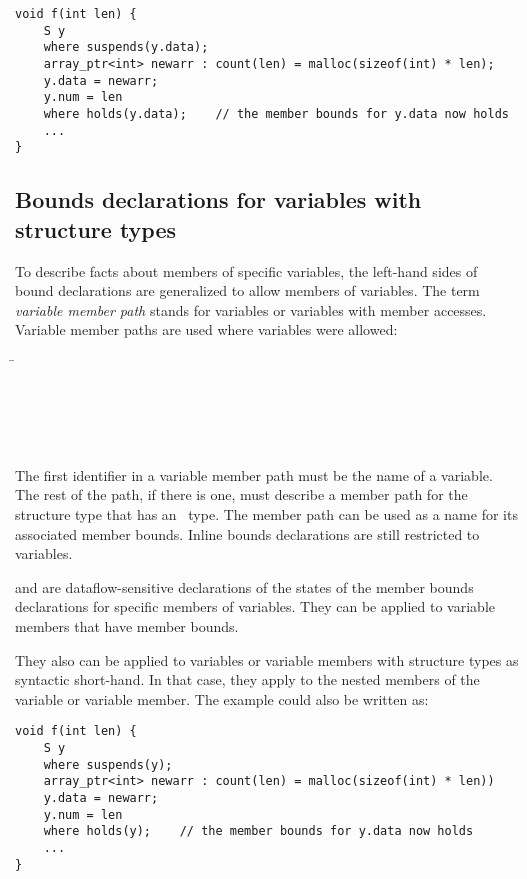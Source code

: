 \begin{lstlisting}
void f(int len) {
    S y 
    where suspends(y.data);
    array_ptr<int> newarr : count(len) = malloc(sizeof(int) * len);
    y.data = newarr;
    y.num = len
    where holds(y.data);    // the member bounds for y.data now holds
    ...
}
\end{lstlisting}

\subsection{Bounds declarations for variables with structure types}

To describe facts about members of specific variables, the left-hand
sides of bound declarations are generalized to allow members of
variables. The term \emph{variable member path} stands for variables or
variables with member accesses. Variable member paths are used where
variables were allowed:
\begin{tabbing}
\=\\
\>  \code{:}  \\
\\
 \\
\>  \\
\>   
\end{tabbing}

The first identifier in a variable member path must be the name of a
variable. The rest of the path, if there is one, must
describe a member path for the structure type that has an
\arrayptr\ type. The member path can be used as a name for its
associated member bounds. Inline bounds declarations are still
restricted to variables.

 and  are dataflow-sensitive declarations of 
the states of the member bounds declarations for specific members of variables. They can be
applied to variable members that have member bounds.

They also can be applied to variables or variable members with structure
types as syntactic short-hand. In that case, they apply to the nested
members of the variable or variable member. The example could also be
written as:

\begin{lstlisting}
void f(int len) {
    S y 
    where suspends(y);
    array_ptr<int> newarr : count(len) = malloc(sizeof(int) * len))
    y.data = newarr;
    y.num = len
    where holds(y);    // the member bounds for y.data now holds
    ...
}
\end{lstlisting}

